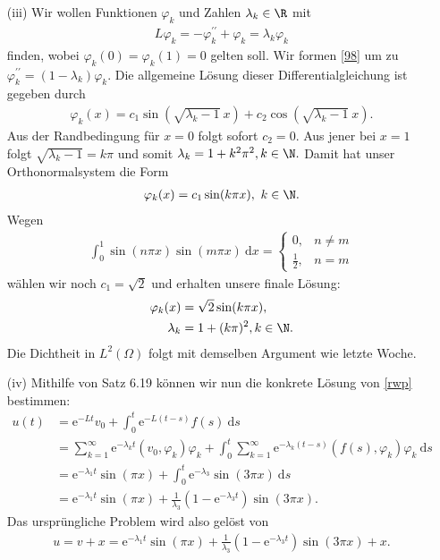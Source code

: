 \begin{solution}
\begin{itemize}
    \item[(iii)] Wir wollen Funktionen $\varphi_k$ und Zahlen $\lambda_k \in \R$ mit
    \begin{align}\label{98}
        L\varphi_k = - \varphi_k^{\prime\prime} + \varphi_k = \lambda_k\varphi_k
    \end{align}
    finden, wobei $\varphi_k(0) = \varphi_k(1) = 0$ gelten soll.
    Wir formen \eqref{98} um zu $\varphi_k^{\prime\prime} = (1 - \lambda_k) \varphi_k$.
    Die allgemeine Lösung dieser Differentialgleichung ist gegeben durch
    \begin{align*}
        \varphi_k(x) = c_1 \sin(\sqrt{\lambda_k - 1}~ x) + c_2 \cos(\sqrt{\lambda_k - 1}~ x).
    \end{align*}
    Aus der Randbedingung für $x = 0$ folgt sofort $c_2 = 0.$ Aus jener bei $x = 1$ folgt $\sqrt{\lambda_k - 1} = k\pi$ und somit $\lambda_k = 1 + k^2\pi^2, k \in \N.$
    Damit hat unser Orthonormalsystem die Form
    \begin{align*}
        \varphi_k(x) = c_1 \sin(k\pi x),~ k \in \N.
    \end{align*}
    Wegen
    \begin{align*}
        \int_0^1 \sin(n\pi x) \sin(m\pi x) \mathrm{~d}x =
        \begin{cases}
            0, & n \neq m\\
            \frac{1}{2}, & n = m
        \end{cases}
    \end{align*}
    wählen wir noch $c_1 = \sqrt 2$ und erhalten unsere finale Lösung:
    \begin{align}
        \varphi_k(x) &= \sqrt 2 \sin(k\pi x),\\
        \lambda_k &= 1 + (k\pi)^2, k \in \N.
    \end{align}
    Die Dichtheit in $L^2(\Omega)$ folgt mit demselben Argument wie letzte Woche.
    \item[(iv)] Mithilfe von Satz 6.19 können wir nun die konkrete Lösung von \eqref{rwp} bestimmen:
    \begin{align*}
        u(t) &= \mathrm{e}^{-Lt}v_0 + \int_0^t \mathrm{e}^{-L(t-s)} f(s) \mathrm{~d} s\\
        &= \sum_{k = 1}^\infty \mathrm{e}^{-\lambda_k t}(v_0, \varphi_k) \varphi_k + \int_0^t \sum_{k = 1}^\infty \mathrm{e}^{-\lambda_k (t-s)}(f(s), \varphi_k) \varphi_k \mathrm{~d} s\\
        &= \mathrm{e}^{-\lambda_1 t} \sin(\pi x) + \int_0^t \mathrm{e}^{-\lambda_3} \sin(3\pi x) \mathrm{~d} s \\
        &= \mathrm{e}^{-\lambda_1 t} \sin(\pi x) + \frac{1}{\lambda_3} (1 - \mathrm{e}^{-\lambda_3 t}) \sin(3\pi x).
    \end{align*}
    Das ursprüngliche Problem wird also gelöst von
    \begin{align*}
        u = v + x = \mathrm{e}^{-\lambda_1 t} \sin(\pi x) + \frac{1}{\lambda_3} (1 - \mathrm{e}^{-\lambda_3 t}) \sin(3\pi x) + x.
    \end{align*}
    \end{itemize}


\end{solution}

